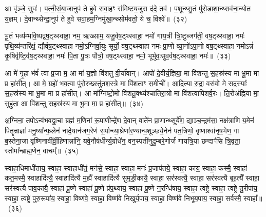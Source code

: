 आ वृ॑ञ्जे॒ सुवः॑। प॒त्नी॒सं॒या॒जानुप॑ ते हुवे सवा॒हꣳ स॑मिष्टय॒जुरा द॑दे॒ तव॑। प॒शून्थ्सु॒तं पु॑रो॒डाशा॒न्थ्सव॑ना॒न्योत य॒ज्ञम्। दे॒वान्थ्सेन्द्रा॒नुप॑ ते हुवे सवा॒हम॒ग्निमु॑खा॒न्थ्सोम॑वतो॒ ये च॒ विश्वे᳚॥~(३२)

{\anuvakamend[{उप॒ ग्रह॒मिडा॑मा॒शिषो॒ द्वात्रिꣳ॑शच्च}]}%

भू॒तं भव्य॑म्भवि॒ष्यद्वष॒ट्थ्\-स्वाहा॒ नम॒ ऋख्साम॒ यजु॒र्वष॒ट्थ्\-स्वाहा॒ नमो॑ गाय॒त्री त्रि॒ष्टुब्जग॑ती॒ वष॒ट्थ्\-स्वाहा॒ नमः॑ पृथि॒व्य॑न्तरि॑क्षं॒ द्यौर्वष॒ट्थ्\-स्वाहा॒ नमो॒\-ऽग्निर्वा॒युः सूर्यो॒ वष॒ट्थ्\-स्वाहा॒ नमः॑ प्रा॒णो व्या॒नो॑\-ऽपा॒नो वष॒ट्थ्\-स्वाहा॒ नमो\-ऽन्नं॑ कृ॒षिर्वृष्टि॒र्वष॒ट्थ्\-स्वाहा॒ नमः॑ पि॒ता पु॒त्रः पौत्रो॒ वष॒ट्थ्\-स्वाहा॒ नमो॒ भूर्भुवः॒सुव॒र्वष॒ट्थ्\-स्वाहा॒ नमः॑॥~(३३)

{\anuvakamend[{भुव॑श्च॒त्वारि॑ च}]}%

आ मे॑ गृ॒हा भ॑वं᳚ त्वा प्र॒जा म॒ आ मा॑ य॒ज्ञो वि॑शतु वी॒र्या॑वान्। आपो॑ दे॒वीर्य॒ज्ञिया॒ मा वि॑शन्तु स॒हस्र॑स्य मा भू॒मा मा प्र हा॑सीत्। आ मे॒ ग्रहो॑ भव॒त्वा पु॑रो॒रुख्स्तु॑तश॒स्त्रे मा वि॑शताꣳ स॒मीची᳚। आ॒दि॒त्या रु॒द्रा वस॑वो मे सद॒स्याः᳚ स॒हस्र॑स्य मा भू॒मा मा प्र हा॑सीत्। आ मा᳚ग्निष्टो॒मो वि॑शतू॒क्थ्य॑श्चातिरा॒त्रो मा वि॑शत्वापिशर्व॒रः। ति॒रोअ॑ह्निया मा॒ सुहु॑ता॒ आ वि॑शन्तु स॒हस्र॑स्य मा भू॒मा मा॒ प्र हा॑सीत्॥~(३४)

{\anuvakamend[{अ॒ग्नि॒ष्टो॒मो वि॑शत्व॒ष्टाद॑श च}]}%

अ॒ग्निना॒ तपो\-ऽन्व॑भवद्वा॒चा ब्रह्म॑ म॒णिना॑ रू॒पाणीन्द्रे॑ण दे॒वान् वाते॑न प्रा॒णान्थ्सूर्ये॑ण॒ द्याञ्च॒न्द्रम॑सा॒ नक्ष॑त्राणि य॒मेन॑ पितॄन्राज्ञा॑ मनु॒ष्या᳚न्फ॒लेन॑ नादे॒यान॑जग॒रेण॑ स॒र्पान्व्या॒घ्रेणा॑र॒ण्यान्प॒शूञ्छ्ये॒नेन॑ पत॒त्रिणो॒ वृष्णाश्वा॑नृष॒भेण॒ गा ब॒स्तेना॒जा वृ॒ष्णिनावी᳚र्व्री॒हिणान्ना॑नि॒ यवे॒नौष॑धीर्न्य॒ग्रोधे॑न॒ वन॒स्पती॑नुदु॒म्बरे॒णोर्जं॑ गायत्रि॒या छन्दाꣳ॑सि त्रि॒वृता॒ स्तोमा᳚न्ब्राह्म॒णेन॒ वाचम्᳚॥~(३५)

{\anuvakamend[{ब्रा॒ह्म॒णेनैक॑ञ्च}]}%

स्वाहा॒धिमाधी॑ताय॒ स्वाहा॒ स्वाहाधी॑तं॒ मन॑से॒ स्वाहा॒ स्वाहा॒ मनः॑ प्र॒जा\-प॑तये॒ स्वाहा॒ काय॒ स्वाहा॒ कस्मै॒ स्वाहा॑ कत॒मस्मै॒ स्वाहादि॑त्यै॒ स्वाहादि॑त्यै म॒ह्यै᳚ स्वाहादि॑त्यै सुमृडी॒कायै॒ स्वाहा॒ सर॑स्वत्यै॒ स्वाहा॒ सर॑स्वत्यै बृह॒त्यै᳚ स्वाहा॒ सर॑स्वत्यै पाव॒कायै॒ स्वाहा॑ पू॒ष्णे स्वाहा॑ पू॒ष्णे प्र॑प॒थ्या॑य॒ स्वाहा॑ पू॒ष्णे न॒रन्धि॑षाय॒ स्वाहा॒ त्वष्ट्रे॒ स्वाहा॒ त्वष्ट्रे॑ तु॒रीपा॑य॒ स्वाहा॒ त्वष्ट्रे॑ पुरु॒रूपा॑य॒ स्वाहा॒ विष्ण॑वे॒ स्वाहा॒ विष्ण॑वे निखुर्य॒पाय॒ स्वाहा॒ विष्ण॑वे निभूय॒पाय॒ स्वाहा॒ सर्वस्मै॒ स्वाहा᳚॥~(३६)

